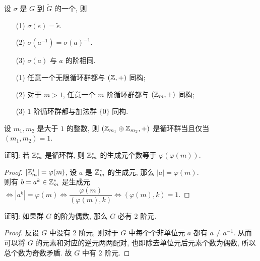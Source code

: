 \begin{proposition}
	设 $\sigma$ 是 $G$ 到 $\widetilde{G}$ 的一个, 则
	\begin{itemize}[leftmargin=1.5cm]
		\item[(1)] $\sigma(e)=\widetilde{e}$.
		\item[(2)]$\sigma(a^{-1})=\sigma(a)^{-1}$.
		\item[(3)]$\sigma(a)$ 与 $a$ 的阶相同.
	\end{itemize}
\end{proposition}


\begin{theorem}
	\begin{itemize}
		\item[(1)] 任意一个无限循环群都与 $(\mathbb Z,+)$ 同构;
		\item[(2)] 对于 $m>1$, 任意一个 $m$ 阶循环群都与 $(\mathbb Z_m,+)$ 同构;
		\item[(3)] $1$ 阶循环群都与加法群 $\{0\}$ 同构.
	\end{itemize}
\end{theorem}

\begin{theorem}
	设 $m_1,m_2$ 是大于 $1$ 的整数, 则 $(\mathbb Z_{m_1}\oplus\mathbb Z_{m_2},+)$ 是循环群当且仅当 $(m_1,m_2)=1$.
\end{theorem}

\begin{practice}
	\problem 证明: 若 $\mathbb Z_m^*$ 是循环群, 则 $\mathbb Z_m^*$ 的生成元个数等于 $\varphi(\varphi(m))$.
	\begin{proof}
		$|\mathbb Z_m^*|=\varphi(m)$, 设 $a$ 是 $\mathbb Z_m^*$ 的生成元, 那么 $|a|=\varphi(m)$.
		\\则有 $b=a^k\in\mathbb Z_m^*$ 是生成元 $\Leftrightarrow |a^k|=\varphi(m)\Leftrightarrow \dfrac{\varphi(m)}{(\varphi(m),k)}\Leftrightarrow(\varphi(m),k)=1$.
	\end{proof}

	\problem 证明: 如果群 $G$ 的阶为偶数, 那么 $G$ 必有 $2$ 阶元.
	\begin{proof}
		反设 $G$ 中没有 $2$ 阶元, 则对于 $G$ 中每个个非单位元 $a$ 都有 $a\neq a^{-1}$. 从而可以将 $G$ 的元素和对应的逆元两两配对, 也即除去单位元后元素个数为偶数, 所以总个数为奇数矛盾. 故 $G$ 中有 $2$ 阶元.
	\end{proof}
\end{practice}